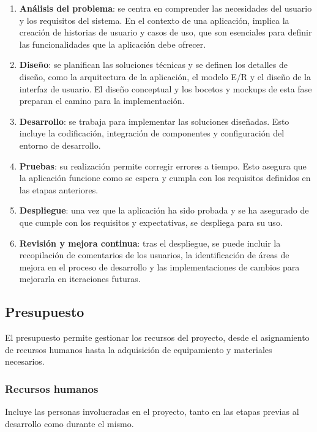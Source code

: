 \begin{enumerate}
    \item \textbf{Análisis del problema}: se centra en comprender las necesidades del usuario y los requisitos del sistema. En el contexto de una aplicación, implica la creación de historias de usuario y casos de uso, que son esenciales para definir las funcionalidades que la aplicación debe ofrecer.
    \item \textbf{Diseño}: se planifican las soluciones técnicas y se definen los detalles de diseño, como la arquitectura de la aplicación, el modelo E/R y el diseño de la interfaz de usuario. El diseño conceptual y los bocetos y mockups de esta fase preparan el camino para la implementación.
    \item \textbf{Desarrollo}: se trabaja para implementar las soluciones diseñadas. Esto incluye la codificación, integración de componentes y configuración del entorno de desarrollo.
    \item \textbf{Pruebas}: su realización permite corregir errores a tiempo. Esto asegura que la aplicación funcione como se espera y cumpla con los requisitos definidos en las etapas anteriores.
    \item \textbf{Despliegue}: una vez que la aplicación ha sido probada y se ha asegurado de que cumple con los requisitos y expectativas, se despliega para su uso.
    \item \textbf{Revisión y mejora continua}: tras el despliegue, se puede incluir la recopilación de comentarios de los usuarios, la identificación de áreas de mejora en el proceso de desarrollo y las implementaciones de cambios para mejorarla en iteraciones futuras.
\end{enumerate}

\newpage

\subsection{Presupuesto}

El presupuesto permite gestionar los recursos del proyecto, desde el asignamiento de recursos humanos hasta la adquisición de equipamiento y materiales necesarios.

\subsubsection{Recursos humanos}
Incluye las personas involucradas en el proyecto, tanto en las etapas previas al desarrollo como durante el mismo.

